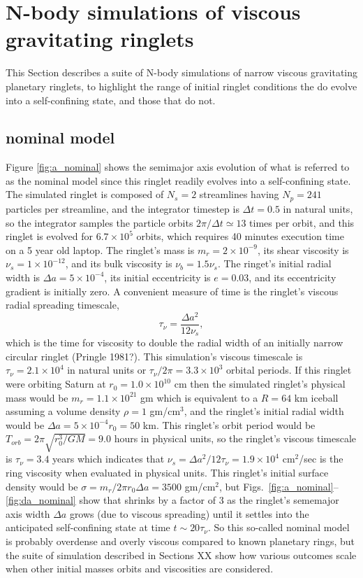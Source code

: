 \documentclass[preprint]{aastex62}
\begin{document}
\section{N-body simulations of viscous gravitating ringlets}
\label{sec:nbody}

This Section describes a suite of N-body simulations of narrow viscous gravitating planetary
ringlets, to highlight the range of initial ringlet conditions the do evolve into
a self-confining state, and those that do not.

\subsection{nominal model}
\label{subsec:nominal}

Figure \ref{fig:a_nominal} shows the semimajor axis evolution of what is referred to
as the nominal model since this ringlet readily evolves into a self-confining state.
The simulated ringlet is composed of $N_s=2$ streamlines having $N_p=241$ particles
per streamline, and the integrator timestep is $\Delta t=0.5$ in natural units, so
the integrator samples the particle orbits $2\pi/\Delta t\simeq13$ times per orbit, and this
ringlet is evolved for $6.7\times10^5$ orbits, which requires 40 minutes execution time
on a 5 year old laptop. The ringlet's mass is
$m_r=2\times10^{-9}$, its shear viscosity is $\nu_s=1\times10^{-12}$, and its
bulk viscosity is $\nu_b=1.5\nu_s$. The ringet's initial radial width is
$\Delta a = 5\times10^{-4}$, its initial eccentricity is $e=0.03$, and its
eccentricity gradient is initially zero. A convenient measure of time is the ringlet's
viscous radial spreading timescale,
\begin{equation}
    \tau_\nu=\frac{\Delta a^2}{12\nu_s}, 
\end{equation}
which is the time for viscosity to double the radial width of an initially narrow circular ringlet
(Pringle 1981?). This simulation's viscous timescale is $\tau_\nu=2.1\times10^4$ in natural units
or $\tau_\nu/2\pi=3.3\times10^3$ orbital periods. If this ringlet were orbiting Saturn
at $r_0=1.0\times10^{10}$ cm then the simulated ringlet's physical mass
would be $m_r=1.1\times10^{21}$ gm which is equivalent to a $R=64$ km iceball assuming
a volume density $\rho=1$ gm/cm$^3$, and the ringlet's initial radial width would be
$\Delta a = 5\times10^{-4}r_0=50$ km. This ringlet's
orbit period would be $T_{orb}=2\pi\sqrt{r_0^3/GM}=9.0$ hours in physical units, so 
the ringlet's viscous timescale is $\tau_\nu=3.4$ years 
which indicates that $\nu_s=\Delta a^2/12\tau_\nu = 1.9\times10^4$ cm$^2$/sec
is the ring viscosity when evaluated in physical units. 
This ringlet's initial surface density would be $\sigma=m_r/2\pi r_0\Delta a=3500$ gm/cm$^2$, but
Figs.\ \ref{fig:a_nominal}--\ref{fig:da_nominal} show that shrinks by a factor of 3 as the 
ringlet's sememajor axis width $\Delta a$ grows (due to viscous spreading) until it settles into
the anticipated self-confining state at time $t\sim20\tau_\nu$.
So this so-called nominal
model is probably overdense and overly viscous compared to known planetary rings,
but the suite of simulation described in Sections XX show how various outcomes scale when
other initial masses orbits and viscosities are considered.
\end{document}
